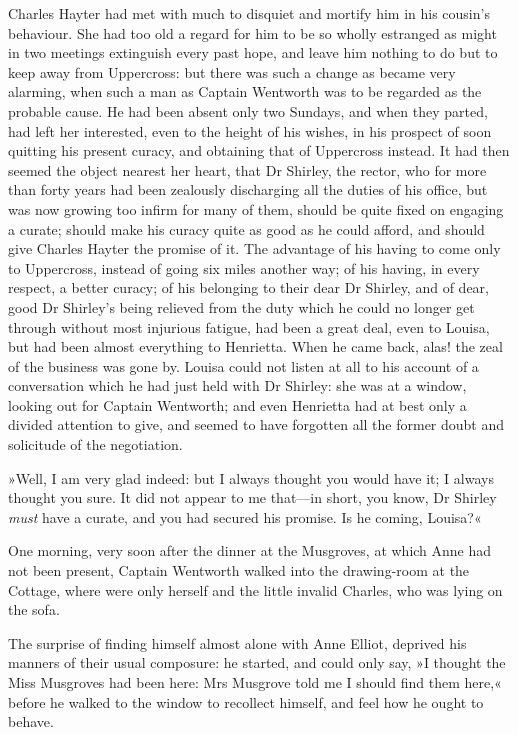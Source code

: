 Charles Hayter had met with much to disquiet and mortify him in his cousin's behaviour. She had too old a regard for him to be so wholly estranged as might in two meetings extinguish every past hope, and leave him nothing to do but to keep away from Uppercross: but there was such a change as became very alarming, when such a man as Captain Wentworth was to be regarded as the probable cause. He had been absent only two Sundays, and when they parted, had left her interested, even to the height of his wishes, in his prospect of soon quitting his present curacy, and obtaining that of Uppercross instead. It had then seemed the object nearest her heart, that Dr Shirley, the rector, who for more than forty years had been zealously discharging all the duties of his office, but was now growing too infirm for many of them, should be quite fixed on engaging a curate; should make his curacy quite as good as he could afford, and should give Charles Hayter the promise of it. The advantage of his having to come only to Uppercross, instead of going six miles another way; of his having, in every respect, a better curacy; of his belonging to their dear Dr Shirley, and of dear, good Dr Shirley's being relieved from the duty which he could no longer get through without most injurious fatigue, had been a great deal, even to Louisa, but had been almost everything to Henrietta. When he came back, alas! the zeal of the business was gone by. Louisa could not listen at all to his account of a conversation which he had just held with Dr Shirley: she was at a window, looking out for Captain Wentworth; and even Henrietta had at best only a divided attention to give, and seemed to have forgotten all the former doubt and solicitude of the negotiation.

»Well, I am very glad indeed: but I always thought you would have it; I always thought you sure. It did not appear to me that—in short, you know, Dr Shirley \textit{must} have a curate, and you had secured his promise. Is he coming, Louisa?«

One morning, very soon after the dinner at the Musgroves, at which Anne had not been present, Captain Wentworth walked into the drawing-room at the Cottage, where were only herself and the little invalid Charles, who was lying on the sofa.

The surprise of finding himself almost alone with Anne Elliot, deprived his manners of their usual composure: he started, and could only say, »I thought the Miss Musgroves had been here: Mrs Musgrove told me I should find them here,« before he walked to the window to recollect himself, and feel how he ought to behave.

